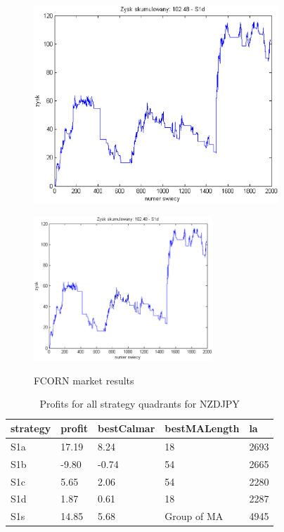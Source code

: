 \documentclass{tewiart}
\begin{document}
\begin{figure}[h]
\begin{minipage}{.49\linewidth}
\label{cztero}
\end{minipage}
\begin{minipage}{.49\linewidth}
\centering
\includegraphics[width=0.82\textwidth]{images/fcornS1d.eps}
\label{mansard}
\end{minipage}
\begin{minipage}{\linewidth}
\centering
\includegraphics[width=0.6\textwidth]{images/fcornS1s.eps}
\label{mansard}
\end{minipage}
\caption{FCORN market results}
\end{figure}
\FloatBarrier
\newpage
\begin{table}[!t]
\caption{Profits for all strategy quadrants for NZDJPY}
 \begin{center}
 \begin{tabular}{|l|l|l|l|l|}
 \hline \textbf{strategy} & \textbf{profit} & \textbf{bestCalmar} & \textbf{bestMALength} & \textbf{la} \\ \hline
S1a & 17.19 & 8.24 & 18 & 2693\\ \hline
S1b & -9.80 & -0.74 & 54 & 2665\\ \hline
S1c & 5.65 & 2.06 & 54 & 2280\\ \hline
S1d & 1.87 & 0.61 & 18 & 2287\\ \hline
S1s & 14.85 & 5.68 & Group of MA & 4945\\
\hline \end{tabular}
 \end{center}
 \end{table}
\end{document}
